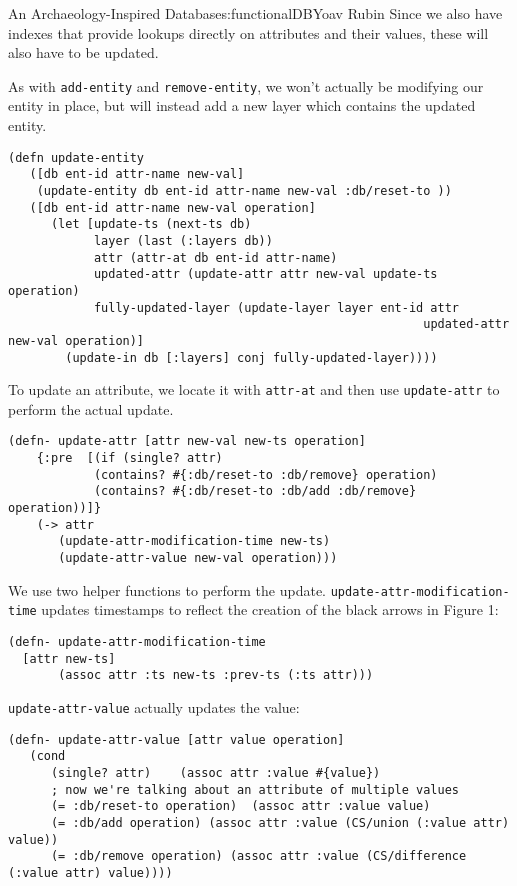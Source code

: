 \begin{aosachapter}{An Archaeology-Inspired Database}{s:functionalDB}{Yoav Rubin}
Since we also have indexes that provide lookups directly on attributes
and their values, these will also have to be updated.

As with \texttt{add-entity} and \texttt{remove-entity}, we won't
actually be modifying our entity in place, but will instead add a new
layer which contains the updated entity.

\begin{verbatim}
(defn update-entity
   ([db ent-id attr-name new-val]
    (update-entity db ent-id attr-name new-val :db/reset-to ))
   ([db ent-id attr-name new-val operation]
      (let [update-ts (next-ts db)
            layer (last (:layers db))
            attr (attr-at db ent-id attr-name)
            updated-attr (update-attr attr new-val update-ts operation)
            fully-updated-layer (update-layer layer ent-id attr 
                                                          updated-attr new-val operation)]
        (update-in db [:layers] conj fully-updated-layer))))
\end{verbatim}

To update an attribute, we locate it with \texttt{attr-at} and then use
\texttt{update-attr} to perform the actual update.

\begin{verbatim}
(defn- update-attr [attr new-val new-ts operation]
    {:pre  [(if (single? attr)
            (contains? #{:db/reset-to :db/remove} operation)
            (contains? #{:db/reset-to :db/add :db/remove} operation))]}
    (-> attr
       (update-attr-modification-time new-ts)
       (update-attr-value new-val operation)))
\end{verbatim}

We use two helper functions to perform the update.
\texttt{update-attr-modification-time} updates timestamps to reflect the
creation of the black arrows in Figure 1:

\begin{verbatim}
(defn- update-attr-modification-time  
  [attr new-ts]
       (assoc attr :ts new-ts :prev-ts (:ts attr)))
\end{verbatim}

\texttt{update-attr-value} actually updates the value:

\begin{verbatim}
(defn- update-attr-value [attr value operation]
   (cond
      (single? attr)    (assoc attr :value #{value})
      ; now we're talking about an attribute of multiple values
      (= :db/reset-to operation)  (assoc attr :value value)
      (= :db/add operation) (assoc attr :value (CS/union (:value attr) value))
      (= :db/remove operation) (assoc attr :value (CS/difference (:value attr) value))))
\end{verbatim}


\end{aosachapter}

